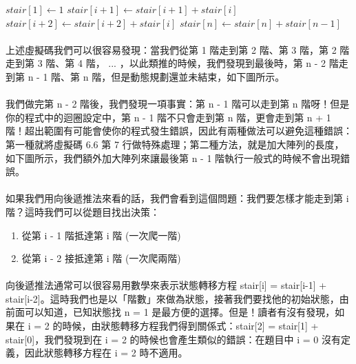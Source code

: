 \documentclass[12pt,a4paper,oneside]{report}
\begin{document}
\begin{CJK}{UTF8}{bkai}
\begin{algorithm}
  \centering
  \begin{algorithmic}[1]
    \State $stair[1]\gets{1}$
      \State $stair[i+1]\gets{stair[i+1]+stair[i]}$
      \State $stair[i+2]\gets{stair[i+2]+stair[i]}$
    \EndFor
    \State $stair[n]\gets{stair[n]+stair[n-1]}$
  \EndProcedure
  \end{algorithmic}
\end{algorithm}

\paragraph{}上述虛擬碼我們可以很容易發現：當我們從第 1 階走到第 2 階、第 3 階，第 2 階走到第 3 階、第 4 階， ... ，以此類推的時候，我們發現到最後時，第 n - 2 階走到第 n - 1 階、第 n 階，但是動態規劃還並未結束，如下圖所示。

\paragraph{}我們做完第 n - 2 階後，我們發現一項事實：第 n - 1 階可以走到第 n 階呀！但是你的程式中的迴圈設定中，第 n - 1 階不只會走到第 n 階，更會走到第 n + 1 階！超出範圍有可能會使你的程式發生錯誤，因此有兩種做法可以避免這種錯誤：第一種就將虛擬碼 6.6 第 7 行做特殊處理；第二種方法，就是加大陣列的長度，如下圖所示，我們額外加大陣列來讓最後第 n - 1 階執行一般式的時候不會出現錯誤。

\paragraph{}如果我們用向後遞推法來看的話，我們會看到這個問題：我們要怎樣才能走到第 i 階？這時我們可以從題目找出決策：

\begin{enumerate}
\item 從第 i - 1 階抵達第 i 階 (一次爬一階)
\item 從第 i - 2 接抵達第 i 階 (一次爬兩階)
\end{enumerate}

\paragraph{}向後遞推法通常可以很容易用數學來表示狀態轉移方程 stair[i] = stair[i-1] + stair[i-2]。這時我們也是以「階數」來做為狀態，接著我們要找他的初始狀態，由前面可以知道，已知狀態找 n = 1 是最方便的選擇。但是！讀者有沒有發現，如果在 i = 2 的時候，由狀態轉移方程我們得到關係式：stair[2] = stair[1] + stair[0]，我們發現到在 i = 2 的時候也會產生類似的錯誤：在題目中 i = 0 沒有定義，因此狀態轉移方程在 i = 2 時不適用。


\end{CJK}
\end{document}
